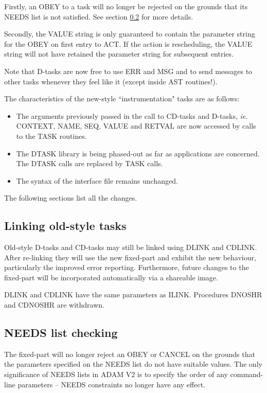 \documentclass[twoside,11pt]{article}
\renewcommand{\_}{\texttt{\symbol{95}}}
\begin{document}
Firstly, an OBEY to a task will no longer be rejected on the grounds 
that its NEEDS list is not satisfied. See section \ref{needs} for more details.

Secondly, the VALUE string is only guaranteed to contain the parameter 
string for the OBEY on first entry to ACT. If the action is 
rescheduling, the VALUE string will not have retained the parameter 
string for subsequent entries.

Note that D-tasks are now free to use ERR and MSG and to send messages
to other tasks whenever they feel like it (except inside AST routines!).

The characteristics of the new-style ``instrumentation" tasks are as 
follows:
\begin{itemize}
\item The arguments previously passed in the call to CD-tasks and D-tasks, 
{\em ie.} CONTEXT, NAME, SEQ, VALUE and RETVAL are now accessed by calls to the
TASK routines. 
\item The DTASK library is being phased-out as far as applications are 
concerned. The DTASK\_ calls are replaced by TASK\_ calls.
\item The syntax of the interface file remains unchanged.
\end{itemize}
The following sections list all the changes.

\subsection{Linking old-style tasks}

Old-style D-tasks and CD-tasks may still be linked using DLINK and CDLINK.
After re-linking they will use the new fixed-part and exhibit the new
behaviour, particularly the improved error reporting. Furthermore, future 
changes to the fixed-part will be incorporated automatically via a shareable 
image.

DLINK and CDLINK have the same parameters as ILINK. Procedures DNOSHR and
CDNOSHR are withdrawn.

\subsection{NEEDS list checking}
\label{needs}

The fixed-part will no longer reject an OBEY or CANCEL on the grounds 
that the parameters specified on the NEEDS list do not have suitable 
values.
The only significance of NEEDS lists in ADAM V2 is to specify the order of any
command-line parameters -- NEEDS constraints no longer have any effect.
\end{document}
